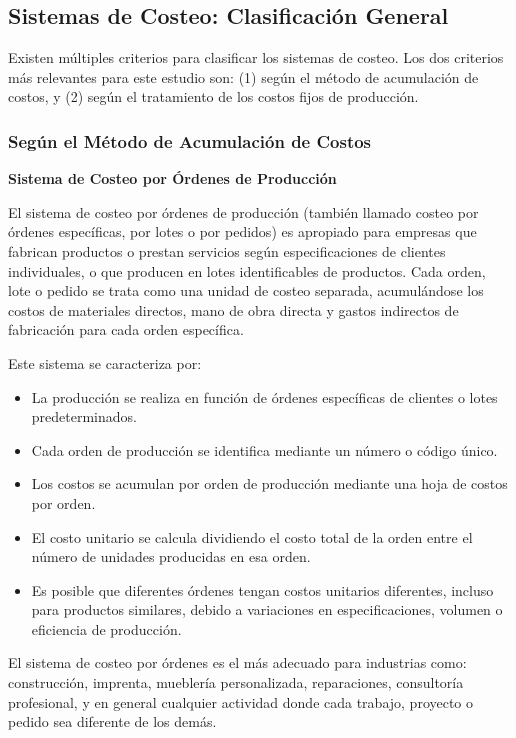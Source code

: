 \documentclass[
  stu,
  floatsintext,
  longtable,
  a4paper,
  nolmodern,
  notxfonts,
  notimes,
  12pt,
  colorlinks=true,linkcolor=blue,citecolor=blue,urlcolor=blue]{apa7}
\providecommand{\tightlist}{%
  \setlength{\itemsep}{0pt}\setlength{\parskip}{0pt}}
\begin{document}
\subsection{Sistemas de Costeo: Clasificación
General}\label{sistemas-de-costeo-clasificaciuxf3n-general}

Existen múltiples criterios para clasificar los sistemas de costeo. Los
dos criterios más relevantes para este estudio son: (1) según el método
de acumulación de costos, y (2) según el tratamiento de los costos fijos
de producción.

\subsubsection{Según el Método de Acumulación de
Costos}\label{seguxfan-el-muxe9todo-de-acumulaciuxf3n-de-costos}

\textbf{Sistema de Costeo por Órdenes de Producción}

El sistema de costeo por órdenes de producción (también llamado costeo
por órdenes específicas, por lotes o por pedidos) es apropiado para
empresas que fabrican productos o prestan servicios según
especificaciones de clientes individuales, o que producen en lotes
identificables de productos. Cada orden, lote o pedido se trata como una
unidad de costeo separada, acumulándose los costos de materiales
directos, mano de obra directa y gastos indirectos de fabricación para
cada orden específica.

Este sistema se caracteriza por:

\begin{itemize}
\tightlist
\item
  La producción se realiza en función de órdenes específicas de clientes
  o lotes predeterminados.
\item
  Cada orden de producción se identifica mediante un número o código
  único.
\item
  Los costos se acumulan por orden de producción mediante una hoja de
  costos por orden.
\item
  El costo unitario se calcula dividiendo el costo total de la orden
  entre el número de unidades producidas en esa orden.
\item
  Es posible que diferentes órdenes tengan costos unitarios diferentes,
  incluso para productos similares, debido a variaciones en
  especificaciones, volumen o eficiencia de producción.
\end{itemize}

El sistema de costeo por órdenes es el más adecuado para industrias
como: construcción, imprenta, mueblería personalizada, reparaciones,
consultoría profesional, y en general cualquier actividad donde cada
trabajo, proyecto o pedido sea diferente de los demás.
\end{document}
